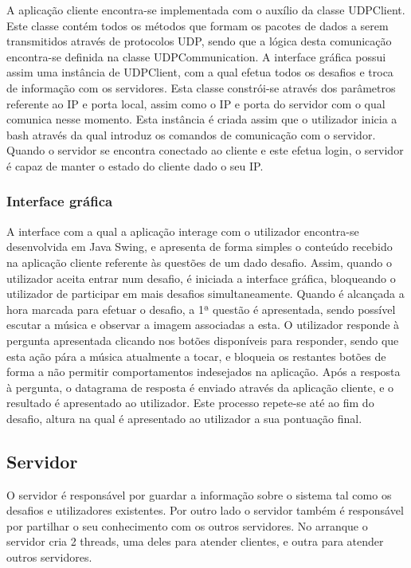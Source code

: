 \documentclass[runningheads,a4paper]{llncs}
\begin{document}
A aplicação cliente encontra-se implementada com o auxílio da classe UDPClient. Este classe contém todos os métodos que formam os pacotes de dados a serem transmitidos através de protocolos UDP, sendo que a lógica desta comunicação encontra-se definida na classe UDPCommunication. A interface gráfica possui assim uma instância de UDPClient, com a qual efetua todos os desafios e troca de informação com os servidores. Esta classe constrói-se através dos parâmetros referente ao IP e porta local, assim como o IP e porta do servidor com o qual comunica nesse momento. Esta instância é criada assim que o utilizador inicia a bash através da qual introduz os comandos de comunicação com o servidor. Quando o servidor se encontra conectado ao cliente e este efetua login, o servidor é capaz de manter o estado do cliente dado o seu IP. 

\subsubsection{Interface gráfica}

A interface com a qual a aplicação interage com o utilizador encontra-se desenvolvida em Java Swing, e apresenta de forma simples o conteúdo recebido na aplicação cliente referente às questões de um dado desafio. Assim, quando o utilizador aceita entrar num desafio, é iniciada a interface gráfica, bloqueando o utilizador de participar em mais desafios simultaneamente. Quando é alcançada a hora marcada para efetuar o desafio, a 1ª questão é apresentada, sendo possível escutar a música e observar a imagem associadas a esta. O utilizador responde à pergunta apresentada clicando nos botões disponíveis para responder, sendo que esta ação pára a música atualmente a tocar, e bloqueia os restantes botões de forma a não permitir comportamentos indesejados na aplicação. Após a resposta à pergunta, o datagrama de resposta é enviado através da aplicação cliente, e o resultado é apresentado ao utilizador. Este processo repete-se até ao fim do desafio, altura na qual é apresentado ao utilizador a sua pontuação final. 

\subsection{Servidor}

O servidor é responsável por guardar a informação sobre o sistema tal como os desafios e utilizadores existentes. Por outro lado o servidor também é responsável por partilhar o seu conhecimento com os outros servidores.
No arranque o servidor cria 2 threads, uma deles para atender clientes, e outra para atender outros servidores.
\end{document}
